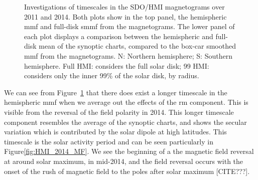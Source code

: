 \begin{figure}[!ht]
	\centering
	\qquad
	\caption{Investigations of timescales in the SDO/HMI magnetograms over 2011 and 2014. Both plots show in the top panel, the hemispheric \gls{mmf} and full-disk \gls{smmf} from the magnetograms. The lower panel of each plot displays a comparison between the hemispheric and full-disk mean of the synoptic charts, compared to the box-car smoothed \gls{mmf} from the magnetograms. N: Northern hemisphere; S: Southern hemisphere. Full HMI: considers the full solar disk; 99 HMI: considers only the inner 99\% of the solar disk, by radius.}
	\label{fig:HMI_MF_vs_synoptics}
\end{figure}

We can see from Figure~\ref{fig:HMI_MF_vs_synoptics} that there does exist a longer timescale in the hemispheric \gls{mmf} when we average out the effects of the \gls{rm} component. This is visible from the reversal of the field polarity in 2014. This longer timescale component resembles the average of the synoptic charts, and shows the secular variation which is contributed by the solar dipole at high latitudes. This timescale is the solar activity period and can be seen particularly in Figure\ref{fig:HMI_2014_MF}. We see the beginning of a the magnetic field reversal at around solar maximum, in mid-2014, and the field reversal occurs with the onset of the rush of magnetic field to the poles after solar maximum [CITE???].

